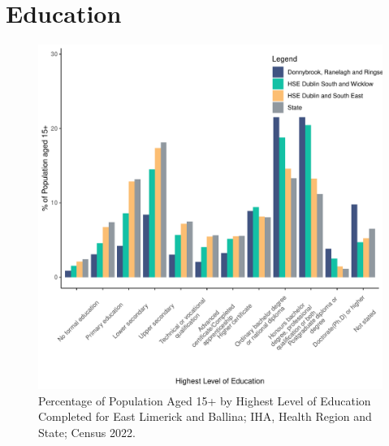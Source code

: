 \documentclass{article}
\begin{document}
\section{Education}\label{sect:Edu}
\begin{figure}[H]
	\centering
	\includegraphics[width = 120mm]{../figures/EduED.pdf}
	\caption{Percentage of Population Aged 15+ by Highest Level of Education Completed for East Limerick and Ballina; IHA, Health Region and State; Census 2022.}
	\label{fig:vbnv}
	\end{figure}
\end{document}
